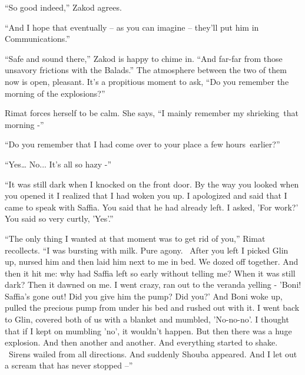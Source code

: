 \documentclass[twoside,11pt]{book}
\begin{document}
``So good indeed,'' Zakod agrees.

``And I hope that eventually -- as you can imagine -- they'll put him in Communications.''

``Safe and sound there,'' Zakod is happy to chime in. ``And far-far from those
unsavory frictions with the Balads.'' The atmosphere between the two of them now is open, pleasant. It's a
propitious moment to ask, ``Do you remember the morning of the explosions?''

Rimat forces herself to be calm. She says, ``I mainly remember my shrieking~that morning -''

``Do you remember that I had come over to your place a few hours~earlier?''

``Yes{\dots} No... It's all so hazy -''

``It was still dark when I knocked on the front door. By the way you looked when you opened it I realized
that I had woken you up. I apologized and said that I came to speak with Saffia. You said that he had already left. I
asked, 'For work?' You said so very curtly, 'Yes'.''

``The only thing I wanted{ }at that moment was to get rid of
you,'' Rimat recollects. ``I was bursting with milk. Pure agony. ~After you left I picked
Glin up, nursed{ }him and then laid him next to me in bed. We dozed off together. And then it hit me:
why had Saffia left so early without telling me? When it was still dark? Then it dawned{ }on me. I went
crazy, ran out to the veranda yelling - 'Boni! Saffia's gone out! Did you give him the pump? Did you?' And Boni woke
up, pulled the precious pump from under his bed and rushed out with it. I went back to Glin, covered both of us with a
blanket and mumbled, 'No-no-no'. I thought that if I kept on mumbling 'no', it wouldn't happen. But then there was a
huge explosion. And then another and another. And everything started to shake. \ Sirens wailed from all directions. And
suddenly Shouba appeared. And I let out a scream that has never stopped --''
\end{document}
